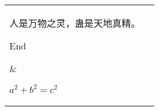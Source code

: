\documentclass[hyperref,UTF8]{ctexart}
\begin{document}
\begin{table}
\setlength{\tabcolsep}{0pt}
\setlength{\arraycolsep}{0pt}
\centering
\begin{tabular}{|l|l|}
\hline 
	\parbox[c][3cm][t]{3cm} %
	{ %
		\rule{0pt}{12pt}%
		人是万物之灵，蛊是天地真精。

		End
	}
&
	\parbox[c][3cm][c]{3cm} {%
		\raggedright%
		$a^2+b^2=c^2$
	}
\\ 
\hline 
	\parbox[c][3cm][b]{3cm} {%
		\raggedleft%
		$a^2+b^2=c^2$
	}
&
	\parbox[c][3cm][c]{3cm} {%
		\centering%
		{$a^2+b^2=c^2$}
	}
\\
\hline
\end{tabular}
\end{table}
\end{document}
